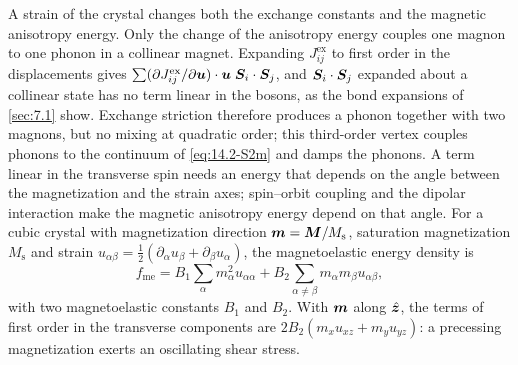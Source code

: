 A strain of the crystal changes both the exchange constants and the magnetic anisotropy energy. Only the change of the anisotropy energy couples one magnon to one phonon in a collinear magnet. Expanding $J^{\mathrm{ex}}_{ij}$ to first order in the displacements gives $\sum(\partial J^{\mathrm{ex}}_{ij}/\partial\bm{u})\cdot\bm{u}\;\bm{S}_i\cdot\bm{S}_j$, and $\bm{S}_i\cdot\bm{S}_j$ expanded about a collinear state has no term linear in the bosons, as the bond expansions of \cref{sec:7.1} show. Exchange striction therefore produces a phonon together with two magnons, but no mixing at quadratic order; this third-order vertex couples phonons to the continuum of \cref{eq:14.2-S2m} and damps the phonons. A term linear in the transverse spin needs an energy that depends on the angle between the magnetization and the strain axes; spin--orbit coupling and the dipolar interaction make the magnetic anisotropy energy depend on that angle. For a cubic crystal with magnetization direction $\bm{m} = \bm{M}/M_{\mathrm{s}}$, saturation magnetization $M_{\mathrm{s}}$ and strain $u_{\alpha\beta} = \frac12(\partial_\alpha u_\beta + \partial_\beta u_\alpha)$, the magnetoelastic energy density is~\cite{kittel1958interaction}
\begin{equation}
  f_{\mathrm{me}} = B_1\sum_\alpha m_\alpha^2u_{\alpha\alpha} + B_2\sum_{\alpha\neq\beta}m_\alpha m_\beta u_{\alpha\beta} ,
  \label{eq:14.2-fme}
\end{equation}
with two magnetoelastic constants $B_1$ and $B_2$. With $\bm{m}$ along $\hat{\bm{z}}$, the terms of first order in the transverse components are $2B_2(m_xu_{xz} + m_yu_{yz})$: a precessing magnetization exerts an oscillating shear stress.


